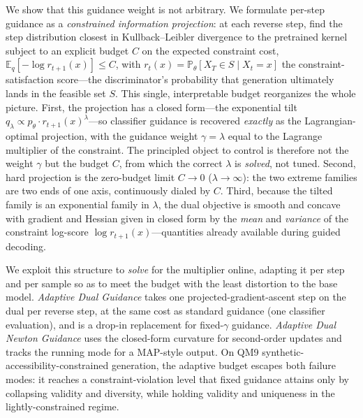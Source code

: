 \documentclass{article}
\newcommand{\E}{\mathbb{E}}
\begin{document}
We show that this guidance weight is not arbitrary. We formulate per-step guidance as a \emph{constrained information projection}: at each reverse step, find the step distribution closest in Kullback--Leibler divergence to the pretrained kernel subject to an explicit budget $C$ on the expected constraint cost, $\E_q[-\log r_{t+1}(x)]\le C$, with $r_t(x)=\mathbb P_\theta[X_T\in S\mid X_t=x]$ the constraint-satisfaction score---the discriminator's probability that generation ultimately lands in the feasible set $S$. This single, interpretable budget reorganizes the whole picture. First, the projection has a closed form---the exponential tilt $q_\lambda\propto p_\theta\cdot r_{t+1}(x)^\lambda$---so classifier guidance is recovered \emph{exactly} as the Lagrangian-optimal projection, with the guidance weight $\gamma=\lambda$ equal to the Lagrange multiplier of the constraint. The principled object to control is therefore not the weight $\gamma$ but the budget $C$, from which the correct $\lambda$ is \emph{solved}, not tuned. Second, hard projection is the zero-budget limit $C\!\to\!0$ ($\lambda\!\to\!\infty$): the two extreme families are two ends of one axis, continuously dialed by $C$. Third, because the tilted family is an exponential family in $\lambda$, the dual objective is smooth and concave with gradient and Hessian given in closed form by the \emph{mean} and \emph{variance} of the constraint log-score $\log r_{t+1}(x)$---quantities already available during guided decoding.

We exploit this structure to \emph{solve} for the multiplier online, adapting it per step and per sample so as to meet the budget with the least distortion to the base model. \emph{Adaptive Dual Guidance} takes one projected-gradient-ascent step on the dual per reverse step, at the same cost as standard guidance (one classifier evaluation), and is a drop-in replacement for fixed-$\gamma$ guidance. \emph{Adaptive Dual Newton Guidance} uses the closed-form curvature for second-order updates and tracks the running mode for a MAP-style output. On QM9 synthetic-accessibility-constrained generation, the adaptive budget escapes both failure modes: it reaches a constraint-violation level that fixed guidance attains only by collapsing validity and diversity, while holding validity and uniqueness in the lightly-constrained regime.
\end{document}
